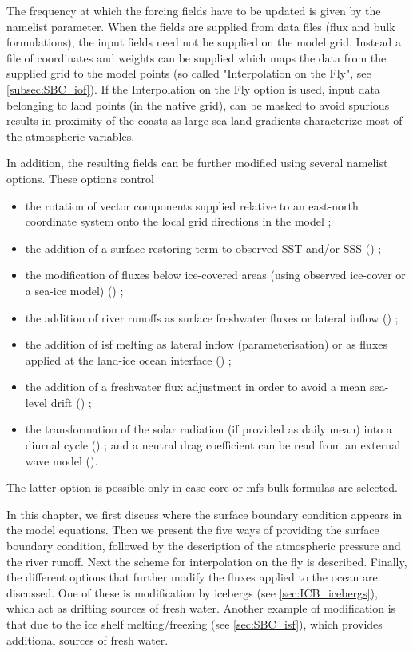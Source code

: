\documentclass[../tex_main/NEMO_manual]{subfiles}
\begin{document}
The frequency at which the forcing fields have to be updated is given by the  namelist parameter. 
When the fields are supplied from data files (flux and bulk formulations), the input fields 
need not be supplied on the model grid. Instead a file of coordinates and weights can 
be supplied which maps the data from the supplied grid to the model points 
(so called "Interpolation on the Fly", see \autoref{subsec:SBC_iof}).
If the Interpolation on the Fly option is used, input data belonging to land points (in the native grid),
can be masked to avoid spurious results in proximity of the coasts  as large sea-land gradients characterize
most of the atmospheric variables.

In addition, the resulting fields can be further modified using several namelist options. 
These options control 
\begin{itemize}
\item the rotation of vector components supplied relative to an east-north 
coordinate system onto the local grid directions in the model ; 
\item the addition of a surface restoring term to observed SST and/or SSS () ; 
\item the modification of fluxes below ice-covered areas (using observed ice-cover or a sea-ice model) () ; 
\item the addition of river runoffs as surface freshwater fluxes or lateral inflow () ; 
\item the addition of isf melting as lateral inflow (parameterisation) or as fluxes applied at the land-ice ocean interface () ; 
\item the addition of a freshwater flux adjustment in order to avoid a mean sea-level drift () ; 
\item the transformation of the solar radiation (if provided as daily mean) into a diurnal cycle () ; 
and a neutral drag coefficient can be read from an external wave model (). 
\end{itemize}
The latter option is possible only in case core or mfs bulk formulas are selected.

In this chapter, we first discuss where the surface boundary condition appears in the
model equations. Then we present the five ways of providing the surface boundary condition, 
followed by the description of the atmospheric pressure and the river runoff. 
Next the scheme for interpolation on the fly is described.
Finally, the different options that further modify the fluxes applied to the ocean are discussed.
One of these is modification by icebergs (see \autoref{sec:ICB_icebergs}), which act as drifting sources of fresh water.
Another example of modification is that due to the ice shelf melting/freezing (see \autoref{sec:SBC_isf}), 
which provides additional sources of fresh water.
\end{document}
